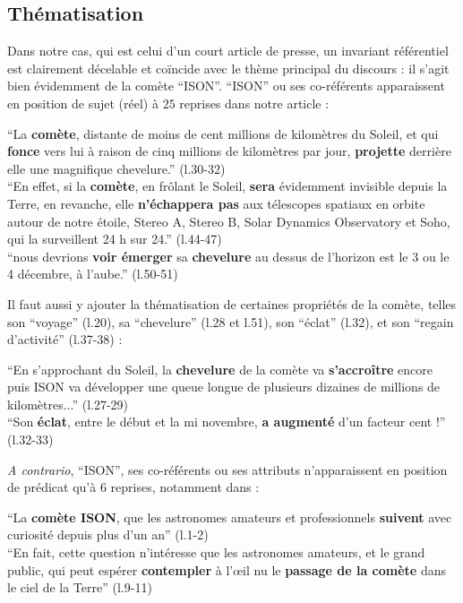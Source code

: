 \documentclass[a4paper,10pt]{article}
\begin{document}
		\subsection{Thématisation}
			Dans notre cas, qui est celui d'un court article de presse, un invariant référentiel est clairement décelable et coïncide avec le thème principal du discours : il s'agit bien évidemment de la comète ``ISON''. ``ISON'' ou ses co-référents apparaissent en position de sujet (réel) à $25$ reprises dans notre article :
				\begin{center}
					\footnotesize
					\begin{minipage}{0.7\textwidth}
						``La \textbf{comète}, distante de moins de cent millions de kilomètres du Soleil, et qui \textbf{fonce} vers lui à raison de cinq millions de kilomètres par jour, \textbf{projette} derrière elle une magnifique chevelure.'' (l.30-32)\\
						``En effet, si la \textbf{comète}, en frôlant le Soleil, \textbf{sera} évidemment invisible depuis la Terre, en revanche, elle \textbf{n'échappera pas} aux télescopes spatiaux en orbite autour de notre étoile, Stereo A, Stereo B, Solar Dynamics Observatory et Soho, qui la surveillent 24 h sur 24.'' (l.44-47)\\
						``nous devrions \textbf{voir émerger} sa \textbf{chevelure} au dessus de l'horizon est le 3 ou le 4 décembre, à l'aube.'' (l.50-51)
					\end{minipage}
				\end{center}
			Il faut aussi y ajouter la thématisation de certaines propriétés de la comète, telles son ``voyage'' (l.20), sa ``chevelure'' (l.28 et l.51), son ``éclat'' (l.32), et son ``regain d'activité'' (l.37-38) :
			\begin{center}
				\footnotesize
				\begin{minipage}{0.7\textwidth}
						``En s'approchant du Soleil, la \textbf{chevelure} de la comète va \textbf{s’accroître} encore puis ISON va développer une queue longue de plusieurs dizaines de millions de kilomètres...'' (l.27-29)\\
						``Son \textbf{éclat}, entre le début et la mi novembre, \textbf{a augmenté} d'un facteur cent !''  (l.32-33)
				\end{minipage}
			\end{center}
			\textit{A contrario}, ``ISON'', ses co-référents ou ses attributs n'apparaissent en position de prédicat qu'à $6$ reprises, notamment dans :
			\begin{center}
				\footnotesize
				\begin{minipage}{0.7\textwidth}
					``La \textbf{comète ISON}, que les astronomes amateurs et professionnels \textbf{suivent} avec curiosité depuis plus d'un an'' (l.1-2)\\
					``En fait, cette question n'intéresse que les astronomes amateurs, et le grand public, qui peut espérer \textbf{contempler} à l’œil nu le \textbf{passage de la comète} dans le ciel de la Terre'' (l.9-11) 
				\end{minipage}
			\end{center}
\end{document}
